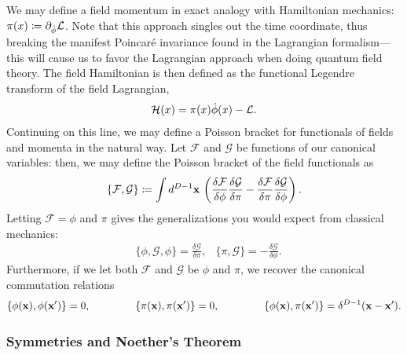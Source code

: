\documentclass[11pt]{article}
\newcommand{\fd}[2]{\frac{\delta #1}{\delta #2}} %
\begin{document}
We may define a field momentum in exact analogy with Hamiltonian mechanics:
$\pi(x) \coloneqq \partial_{\dot \phi} \mathcal{L}$. Note that this approach singles out the
time coordinate, thus breaking the manifest Poincaré invariance found in
the Lagrangian formalism---this will cause us to favor the Lagrangian approach
when doing quantum field theory. The field Hamiltonian is then defined as the functional
Legendre transform of the field Lagrangian, 
\begin{align*}
    \mathcal{H}(x) = \pi(x) \dot{\phi}(x) - \mathcal{L}.
\end{align*}
Continuing on this line, we may define a Poisson
bracket for functionals of fields and momenta in the natural way. Let $\mathcal{F}$
and $\mathcal{G}$ be functions of our canonical variables: then, we may define
the Poisson bracket of the field functionals as
\begin{align*}
    \{ \mathcal{F}, \mathcal{G} \} \coloneqq \int d^{D - 1} \bfx \, \left(
    \fd{\mathcal{F}}{\phi} \fd{\mathcal{G}}{\pi}
    - \fd{\mathcal{F}}{\pi} \fd{\mathcal{G}}{\phi} \right). 
\end{align*}
Letting $\mathcal{F} = \phi$ and $\pi$ gives the generalizations 
you would expect from classical mechanics:
\begin{align*}
    & \{ \phi, \mathcal{G}, \phi \} = \fd{\mathcal{G}}{\pi},
    & \{ \pi, \mathcal{G} \} = - \fd{\mathcal{G}}{\phi}.
\end{align*}
Furthermore, if we let both $\mathcal{F}$ and $\mathcal{G}$ be $\phi$ and $\pi$,
we recover the canonical commutation relations
\begin{align*}
    \{ \phi(\mathbf{x}), \phi(\mathbf{x}') \} = 0,
    \hspace{1.5cm}
    \{ \pi(\mathbf{x}), \pi(\mathbf{x}') \} = 0,
    \hspace{1.5cm}
    \{ \phi(\mathbf{x}), \pi(\mathbf{x}') \} = \delta^{D - 1}(\mathbf{x} - \mathbf{x}').
\end{align*}

\subsubsection{Symmetries and Noether's Theorem}
\end{document}
